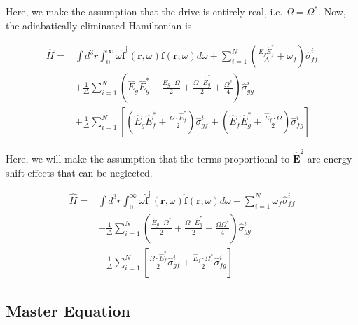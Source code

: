 \documentclass[a4paper, 11pt]{article}
\numberwithin{equation}{section}
\begin{document}
Here, we make the assumption that the drive is entirely real, i.e. $\Omega =
\Omega^*$. Now, the adiabatically eliminated Hamiltonian is

\begin{equation}
  \begin{aligned}
    \hat{H} = & \int d^3r \int_0^\infty \omega \hat{\mathbf{f}}^\dagger (\mathbf{r},
    \omega) \hat{\mathbf{f}}(\mathbf{r}, \omega) d\omega + \sum_{i=1}^N \left(
    \frac{\hat{E}_f \hat{E}_f^*}{\Delta} + \omega_f\right)\hat{\sigma}_{ff}^i\\
    &+\frac{1}{\Delta} \sum_{i=1}^N \left(\hat{E}_g \hat{E}_g^* + \frac{\hat{E}_g
    \cdot \Omega}{2} + \frac{\Omega \cdot \hat{E}^*_g}{2} + \frac{\Omega^2}{4}\right)
    \hat{\sigma}_{gg}^i \\ &+ \frac{1}{\Delta}\sum_{i=1}^N \left[ \left( \hat{E}_g
    \hat{E}_f^* + \frac{\Omega \cdot \hat{E}_f^*}{2} \right)\hat{\sigma}_{gf}^i +
    \left( \hat{E}_f\hat{E}_g^* + \frac{\hat{E}_f \cdot \Omega}{2} \right)
    \hat{\sigma}_{fg}^i \right]
  \end{aligned}
\end{equation}

Here, we will make the assumption that the terms proportional to $\hat{\mathbf{E}}^2$
are energy shift effects that can be neglected.

\begin{equation}
  \boxed{
  \begin{aligned}
    \hat{H} = & \int d^3r \int_0^\infty \omega \hat{\mathbf{f}}^\dagger (\mathbf{r},
    \omega) \hat{\mathbf{f}}(\mathbf{r}, \omega) d\omega + \sum_{i=1}^N
    \omega_f\hat{\sigma}_{ff}^i\\
    &+\frac{1}{\Delta} \sum_{i=1}^N \left(\frac{\hat{E}_g
    \cdot \Omega^*}{2} + \frac{\Omega \cdot \hat{E}^*_g}{2} + \frac{\Omega\Omega^*}{4}\right)
    \hat{\sigma}_{gg}^i \\ &+ \frac{1}{\Delta}\sum_{i=1}^N \left[ \frac{\Omega \cdot
    \hat{E}_f^*}{2} \hat{\sigma}_{gf}^i + \frac{\hat{E}_f \cdot \Omega^*}{2}
    \hat{\sigma}_{fg}^i \right]
  \end{aligned}}
\end{equation}

\subsection{Master Equation}
\end{document}
